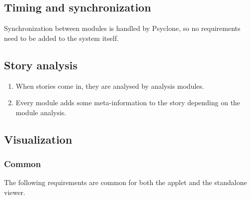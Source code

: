 \subsection{Timing and synchronization}

Synchronization between modules is handled by Psyclone, so no requirements need
to be added to the system itself.

\subsection{Story analysis}

\begin{enumerate}
  \item When stories come in, they are analysed by analysis modules.
  \item Every module adds some meta-information to the story depending on the
        module analysis.
\end{enumerate}

\subsection{Visualization}

\subsubsection{Common}

The following requirements are common for both the applet and the standalone
viewer.

